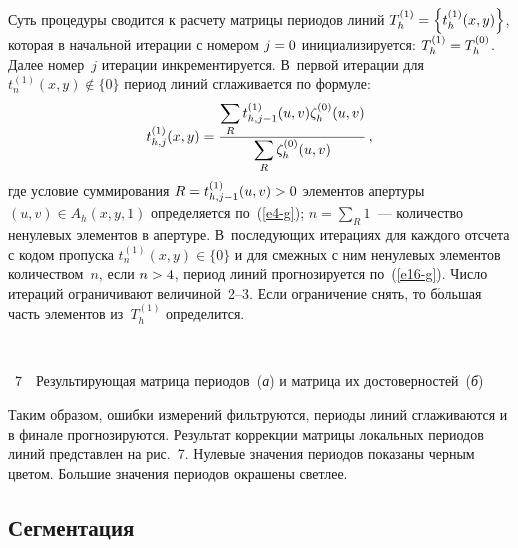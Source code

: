 \begin{multicols}{2}
  Суть процедуры сводится к расчету матрицы периодов линий 
$T_h^{(1)}\hm=\left\{ t_h^{(1)}(x,y)\right\}$, которая в начальной итерации 
с номером $j\hm=0$ инициализируется: $T_h^{(1)}\hm=T_h^{(0)}$. Далее 
номер~$j$ итерации инкрементируется. В~первой итерации для 
$t_n^{(1)}(x,y)\not\in \{0\}$ период линий сглаживается по формуле:
  \begin{equation}
  t_{h,j}^{(1)}(x,y) =\displaystyle\frac{\displaystyle \sum\limits_R t_{h,j-
1}^{(1)}(u,v)\zeta_h^{(0)}(u,v)\mathstrut}{\displaystyle \sum\limits_R \zeta_h^{(0)}(u,v)\mathstrut}\,,
  \label{e16-g}
  \end{equation}
где условие суммирования $R=t_{h,j-1}^{(1)}(u,v)\hm>0$ элементов апертуры 
$(u,v)\in A_h(x,y,1)$ определяется  по~(\ref{e4-g}); $n=\sum\limits_R 1$~--- количество 
ненулевых элементов в апертуре. В~последующих итерациях для каждого 
отсчета с кодом пропуска $t_n^{(1)}(x,y)\in \{0\}$ и для смежных с ним 
ненулевых элементов количеством~$n$, если $n\hm>4$, период линий 
прогнозируется по~(\ref{e16-g}). Число итераций ограничивают 
величиной~2--3. Если ограничение снять, то б$\acute{\mbox{о}}$льшая часть элементов 
из~$T_h^{(1)}$ определится.
\pagebreak

\begin{center} %
\vspace*{1pt}
\mbox{%
 \epsfxsize=79mm
}
\end{center}
\vspace*{3pt}
{{\figurename~7}\ \ \small{Результирующая матрица периодов~(\textit{а}) и матрица их достоверностей~(\textit{б})}}
\vspace*{14pt}

\addtocounter{figure}{1}


  Таким образом, ошибки измерений фильтруются, периоды линий 
сглаживаются и в финале прогнозируются. Результат коррекции матрицы 
локальных периодов линий представлен на рис.~7. Нулевые значения периодов 
показаны черным цветом. Большие значения периодов окрашены светлее.



\subsection{Сегментация} %
  

\end{multicols}
